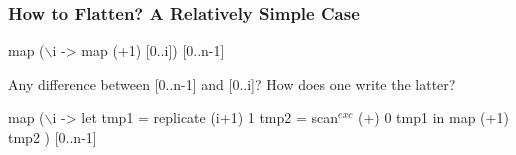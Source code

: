 \documentclass{beamer}
\renewcommand{\emph}[1]{\textcolor{structure}{#1}}
\newcommand{\emp}[1]{\textcolor{DikuRed}{ #1}}
\newcommand{\mymath}[1]{$ #1 $}
\newcommand{\myindu}[1]{^{#1}}
\begin{document}
\begin{frame}[fragile,t]
  \frametitle{How to Flatten? A Relatively Simple Case}
\bigskip
\begin{colorcode}
\alert{map (\mymath{\backslash}i -> map (+1) [0..i]) [0..n-1]}
\end{colorcode}
\bigskip

Any difference between \emph{[0..n-1]} and \emp{[0..i]}?
How does one write the latter?
\pause\bigskip

\begin{colorcode}
\emp{map} (\mymath{\backslash}i -> let tmp1 = \alert{replicate (i+1) 1}
               tmp2 = \alert{scan\mymath{\myindu{exc}} (+) 0 tmp1}
           in         \alert{map (+1) tmp2}     )
    [0..n-1]
\end{colorcode}

\end{frame}
\end{document}

